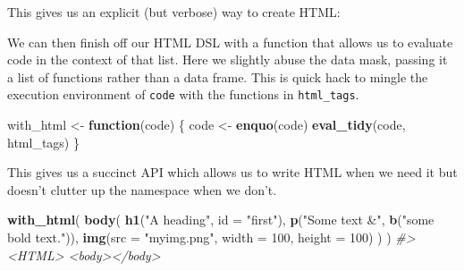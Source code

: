 \documentclass[]{book}
\makeatletter
\newenvironment{Shaded}{\begin{snugshade}}{\end{snugshade}}
\newcommand{\CommentTok}[1]{\textcolor[rgb]{0.37,0.37,0.37}{\textit{#1}}}
\newcommand{\ControlFlowTok}[1]{\textcolor[rgb]{0.27,0.27,0.27}{\textbf{#1}}}
\newcommand{\DataTypeTok}[1]{\textcolor[rgb]{0.27,0.27,0.27}{#1}}
\newcommand{\DecValTok}[1]{\textcolor[rgb]{0.06,0.06,0.06}{#1}}
\newcommand{\KeywordTok}[1]{\textcolor[rgb]{0.27,0.27,0.27}{\textbf{#1}}}
\newcommand{\NormalTok}[1]{#1}
\newcommand{\OperatorTok}[1]{\textcolor[rgb]{0.43,0.43,0.43}{\textbf{#1}}}
\newcommand{\StringTok}[1]{\textcolor[rgb]{0.5,0.5,0.5}{#1}}
\newcommand{\indexc}[1]{\index{#1@\texttt{#1}}}
\makeatother
\begin{document}
This gives us an explicit (but verbose) way to create HTML:

\begin{Shaded}
\end{Shaded}

We can then finish off our HTML DSL with a function that allows us to evaluate code in the context of that list. Here we slightly abuse the data mask, passing it a list of functions rather than a data frame. This is quick hack to mingle the execution environment of \texttt{code} with the functions in \texttt{html\_tags}.

\indexc{eval\_tidy()}

\begin{Shaded}
\begin{Highlighting}[]
\NormalTok{with_html <-}\StringTok{ }\ControlFlowTok{function}\NormalTok{(code) \{}
\NormalTok{  code <-}\StringTok{ }\KeywordTok{enquo}\NormalTok{(code)}
  \KeywordTok{eval_tidy}\NormalTok{(code, html_tags)}
\NormalTok{\}}
\end{Highlighting}
\end{Shaded}

This gives us a succinct API which allows us to write HTML when we need it but doesn't clutter up the namespace when we don't.

\begin{Shaded}
\begin{Highlighting}[]
\KeywordTok{with_html}\NormalTok{(}
  \KeywordTok{body}\NormalTok{(}
    \KeywordTok{h1}\NormalTok{(}\StringTok{"A heading"}\NormalTok{, }\DataTypeTok{id =} \StringTok{"first"}\NormalTok{),}
    \KeywordTok{p}\NormalTok{(}\StringTok{"Some text &"}\NormalTok{, }\KeywordTok{b}\NormalTok{(}\StringTok{"some bold text."}\NormalTok{)),}
    \KeywordTok{img}\NormalTok{(}\DataTypeTok{src =} \StringTok{"myimg.png"}\NormalTok{, }\DataTypeTok{width =} \DecValTok{100}\NormalTok{, }\DataTypeTok{height =} \DecValTok{100}\NormalTok{)}
\NormalTok{  )}
\NormalTok{)}
\CommentTok{#> <HTML> <body></body>}
\end{Highlighting}
\end{Shaded}
\end{document}
